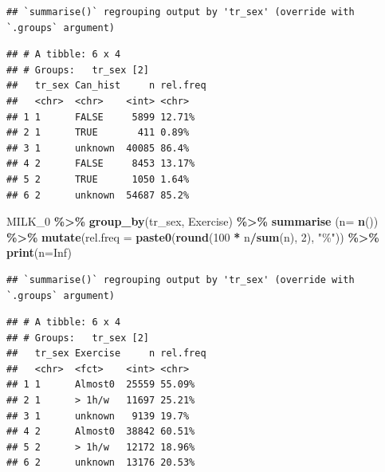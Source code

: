 \documentclass[
]{article}
\newenvironment{Shaded}{\begin{snugshade}}{\end{snugshade}}
\newcommand{\DataTypeTok}[1]{\textcolor[rgb]{0.13,0.29,0.53}{#1}}
\newcommand{\DecValTok}[1]{\textcolor[rgb]{0.00,0.00,0.81}{#1}}
\newcommand{\KeywordTok}[1]{\textcolor[rgb]{0.13,0.29,0.53}{\textbf{#1}}}
\newcommand{\NormalTok}[1]{#1}
\newcommand{\OperatorTok}[1]{\textcolor[rgb]{0.81,0.36,0.00}{\textbf{#1}}}
\newcommand{\OtherTok}[1]{\textcolor[rgb]{0.56,0.35,0.01}{#1}}
\newcommand{\StringTok}[1]{\textcolor[rgb]{0.31,0.60,0.02}{#1}}
\begin{document}
\begin{verbatim}
## `summarise()` regrouping output by 'tr_sex' (override with `.groups` argument)
\end{verbatim}

\begin{verbatim}
## # A tibble: 6 x 4
## # Groups:   tr_sex [2]
##   tr_sex Can_hist     n rel.freq
##   <chr>  <chr>    <int> <chr>   
## 1 1      FALSE     5899 12.71%  
## 2 1      TRUE       411 0.89%   
## 3 1      unknown  40085 86.4%   
## 4 2      FALSE     8453 13.17%  
## 5 2      TRUE      1050 1.64%   
## 6 2      unknown  54687 85.2%
\end{verbatim}

\begin{Shaded}
\begin{Highlighting}[]
\NormalTok{MILK\_}\DecValTok{0} \OperatorTok{\%\textgreater{}\%}\StringTok{ }
\StringTok{  }\KeywordTok{group\_by}\NormalTok{(tr\_sex, Exercise) }\OperatorTok{\%\textgreater{}\%}\StringTok{ }
\StringTok{  }\KeywordTok{summarise}\NormalTok{ (}\DataTypeTok{n=} \KeywordTok{n}\NormalTok{()) }\OperatorTok{\%\textgreater{}\%}
\StringTok{  }\KeywordTok{mutate}\NormalTok{(}\DataTypeTok{rel.freq =} \KeywordTok{paste0}\NormalTok{(}\KeywordTok{round}\NormalTok{(}\DecValTok{100} \OperatorTok{*}\StringTok{ }\NormalTok{n}\OperatorTok{/}\KeywordTok{sum}\NormalTok{(n), }\DecValTok{2}\NormalTok{), }\StringTok{"\%"}\NormalTok{))  }\OperatorTok{\%\textgreater{}\%}\StringTok{ }
\StringTok{  }\KeywordTok{print}\NormalTok{(}\DataTypeTok{n=}\OtherTok{Inf}\NormalTok{)}
\end{Highlighting}
\end{Shaded}

\begin{verbatim}
## `summarise()` regrouping output by 'tr_sex' (override with `.groups` argument)
\end{verbatim}

\begin{verbatim}
## # A tibble: 6 x 4
## # Groups:   tr_sex [2]
##   tr_sex Exercise     n rel.freq
##   <chr>  <fct>    <int> <chr>   
## 1 1      Almost0  25559 55.09%  
## 2 1      > 1h/w   11697 25.21%  
## 3 1      unknown   9139 19.7%   
## 4 2      Almost0  38842 60.51%  
## 5 2      > 1h/w   12172 18.96%  
## 6 2      unknown  13176 20.53%
\end{verbatim}
\end{document}
